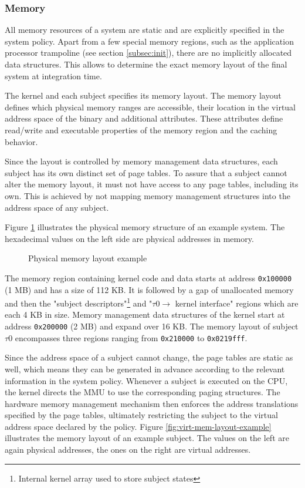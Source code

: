 \subsubsection{Memory}
All memory resources of a system are static and are explicitly specified in the
system policy. Apart from a few special memory regions, such as the application
processor trampoline (see section \ref{subsec:init}), there are no implicitly
allocated data structures. This allows to determine the exact memory layout of
the final system at integration time.

The kernel and each subject specifies its memory layout. The memory layout
defines which physical memory ranges are accessible, their location in the
virtual address space of the binary and additional attributes. These attributes
define read/write and executable properties of the memory region and the caching
behavior.

Since the layout is controlled by memory management data structures,
each subject has its own distinct set of page tables. To assure that a subject
cannot alter the memory layout, it must not have access to any page tables,
including its own. This is achieved by not mapping memory management structures
into the address space of any subject.

Figure \ref{fig:phys-mem-layout-example} illustrates the physical memory
structure of an example system. The hexadecimal values on the left side are
physical addresses in memory.

\begin{figure}[h]
	\centering
	
	\caption{Physical memory layout example}
	\label{fig:phys-mem-layout-example}
\end{figure}

The memory region containing kernel code and data starts at address
\texttt{0x100000} (1 MB) and has a size of 112 KB. It is followed by a gap of
unallocated memory and then the "subject descriptors"\footnote{Internal kernel
array used to store subject states} and "$\tau0\rightarrow$ kernel interface"
regions which are each 4 KB in size.  Memory management data structures of the
kernel start at address \texttt{0x200000} (2 MB) and expand over 16 KB. The
memory layout of subject $\tau0$ encompasses three regions ranging from
\texttt{0x210000} to \texttt{0x0219fff}.

Since the address space of a subject cannot change, the page tables are static
as well, which means they can be generated in advance according to the relevant
information in the system policy. Whenever a subject is executed on the CPU, the
kernel directs the MMU to use the corresponding paging structures. The hardware
memory management mechanism then enforces the address translations specified by
the page tables, ultimately restricting the subject to the virtual address space
declared by the policy. Figure \ref{fig:virt-mem-layout-example} illustrates the
memory layout of an example subject. The values on the left are again physical
addresses, the ones on the right are virtual addresses.

